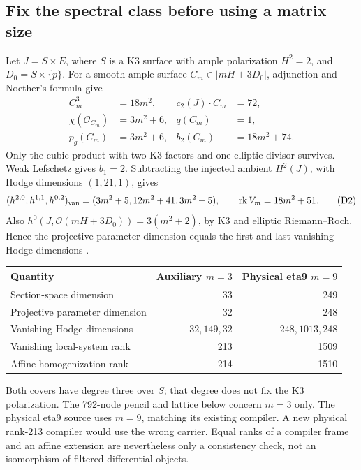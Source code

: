 \documentclass[11pt,a4paper]{article}
\begin{document}
\subsection{Fix the spectral class before using a matrix size}
\label{sec:deligne-rank-separation}
Let \(J=S\times E\), where \(S\) is a K3 surface with ample
polarization \(H^2=2\), and \(D_0=S\times\{p\}\). For a smooth ample
surface \(C_m\in|mH+3D_0|\), adjunction and Noether's formula give
\begin{align}
 C_m^3&=18m^2,& c_2(J)\cdot C_m&=72,\nonumber\\
 \chi(\mathcal O_{C_m})&=3m^2+6,& q(C_m)&=1,\nonumber\\
 p_g(C_m)&=3m^2+6,& b_2(C_m)&=18m^2+74 .
 \label{eq:deligne-surface-ranks}\tag{D1}
\end{align}
Only the cubic product with two K3 factors and one elliptic divisor
survives. Weak Lefschetz gives \(b_1=2\). Subtracting the injected
ambient \(H^2(J)\), with Hodge dimensions \((1,21,1)\), gives
\[
 (h^{2,0},h^{1,1},h^{0,2})_{\rm van}
   =(3m^2+5,12m^2+41,3m^2+5),\qquad
 \operatorname{rk}V_m=18m^2+51 .
 \tag{D2}\label{eq:deligne-vanishing-ranks}
\]
Also \(h^0(J,\mathcal O(mH+3D_0))=3(m^2+2)\), by K3 and elliptic
Riemann--Roch. Hence the projective parameter dimension equals the
first and last vanishing Hodge dimensions
\cite{PreprojectionSpectralRanks2026}.

\begin{center}
\begin{tabular}{lrr}
\toprule
Quantity & Auxiliary \(m=3\) & Physical eta9 \(m=9\)\\
\midrule
Section-space dimension & 33 & 249\\
Projective parameter dimension & 32 & 248\\
Vanishing Hodge dimensions & \(32,149,32\) & \(248,1013,248\)\\
Vanishing local-system rank & 213 & 1509\\
Affine homogenization rank & 214 & 1510\\
\bottomrule
\end{tabular}
\end{center}

Both covers have degree three over \(S\); that degree does not fix
the K3 polarization. The 792-node pencil and lattice below concern
\(m=3\) only. The physical eta9 source uses \(m=9\), matching its
existing compiler. A new physical rank-213 compiler would use the
wrong carrier. Equal ranks of a compiler frame and an affine extension
are nevertheless only a consistency check, not an isomorphism of
filtered differential objects.
\end{document}
